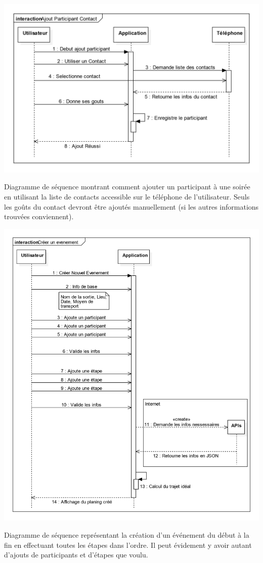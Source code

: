 \documentclass[a4paper, 12pt, notitlepage]{article} %
\begin{document}
\begin{umlFig}[!htb]
   \centering
   \includegraphics[width=\textwidth]{AjoutParticipantContact.png}
   \caption[Diagramme d'ajout d'un participant depuis ses contacts]{Diagramme de séquence montrant comment ajouter un participant à une soirée en utilisant la liste de contacts accessible sur le téléphone de l'utilisateur. Seuls les goûts du contact devront être ajoutés manuellement (si les autres informations trouvées conviennent).}
   \label{UML:AjoutParticipantContact}
\end{umlFig}

\begin{umlFig}[!htb]
   \centering
   \includegraphics[width=\textwidth]{CreerEvenement.png}
   \caption[Diagramme de création complète d'un événement]{Diagramme de séquence représentant la création d'un événement du début à la fin en effectuant toutes les étapes dans l'ordre. Il peut évidement y avoir autant d'ajouts de participants et d'étapes que voulu.}
   \label{UML:CreerEvenement}
\end{umlFig}
\end{document}
